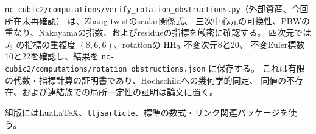 \texttt{nc-cubic2/computations/verify\_rotation\_obstructions.py}（外部資産、今回所在未再確認） は、Zhang twistのscalar関係式、
三次中心元の可換性、PBWの重なり、Nakayamaの指数、およびresidueの指標を厳密に確認する。
四次元では \(J_3\) の指標の重複度 \((8,6,6)\)、rotationの \(\operatorname{HH}_0\) 不変次元8と20、
不変Euler標数10と22を確認し、結果を
\texttt{nc-cubic2/computations/rotation\_obstructions.json} に保存する。
これは有限の代数・指標計算の証明書であり、Hochschildへの幾何学的同定、
同値の不存在、および連結族での局所一定性の証明は論文に置く。

組版にはLuaLaTeX、\texttt{ltjsarticle}、標準の数式・リンク関連パッケージを使う。

\begingroup
\small

\endgroup

